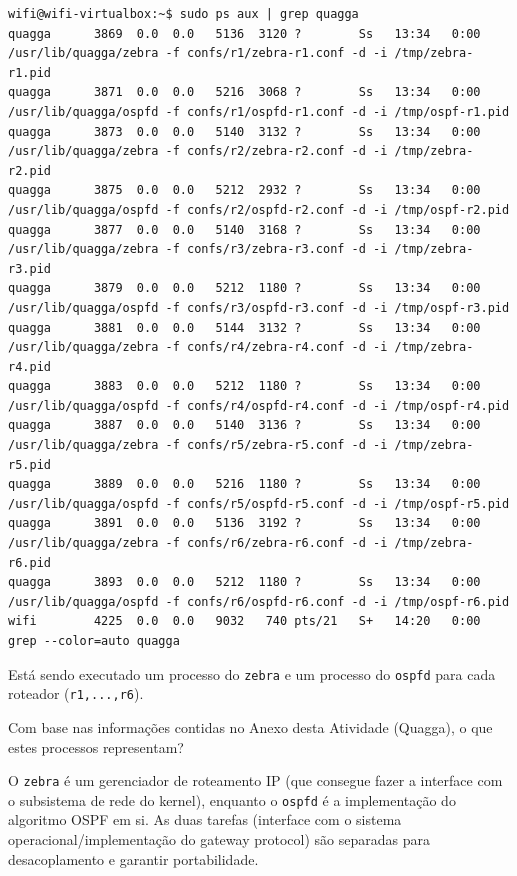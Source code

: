 \documentclass{article}
\begin{document}
\begin{lstlisting}
wifi@wifi-virtualbox:~$ sudo ps aux | grep quagga
quagga      3869  0.0  0.0   5136  3120 ?        Ss   13:34   0:00 /usr/lib/quagga/zebra -f confs/r1/zebra-r1.conf -d -i /tmp/zebra-r1.pid                                                                                           
quagga      3871  0.0  0.0   5216  3068 ?        Ss   13:34   0:00 /usr/lib/quagga/ospfd -f confs/r1/ospfd-r1.conf -d -i /tmp/ospf-r1.pid
quagga      3873  0.0  0.0   5140  3132 ?        Ss   13:34   0:00 /usr/lib/quagga/zebra -f confs/r2/zebra-r2.conf -d -i /tmp/zebra-r2.pid
quagga      3875  0.0  0.0   5212  2932 ?        Ss   13:34   0:00 /usr/lib/quagga/ospfd -f confs/r2/ospfd-r2.conf -d -i /tmp/ospf-r2.pid
quagga      3877  0.0  0.0   5140  3168 ?        Ss   13:34   0:00 /usr/lib/quagga/zebra -f confs/r3/zebra-r3.conf -d -i /tmp/zebra-r3.pid
quagga      3879  0.0  0.0   5212  1180 ?        Ss   13:34   0:00 /usr/lib/quagga/ospfd -f confs/r3/ospfd-r3.conf -d -i /tmp/ospf-r3.pid
quagga      3881  0.0  0.0   5144  3132 ?        Ss   13:34   0:00 /usr/lib/quagga/zebra -f confs/r4/zebra-r4.conf -d -i /tmp/zebra-r4.pid
quagga      3883  0.0  0.0   5212  1180 ?        Ss   13:34   0:00 /usr/lib/quagga/ospfd -f confs/r4/ospfd-r4.conf -d -i /tmp/ospf-r4.pid
quagga      3887  0.0  0.0   5140  3136 ?        Ss   13:34   0:00 /usr/lib/quagga/zebra -f confs/r5/zebra-r5.conf -d -i /tmp/zebra-r5.pid
quagga      3889  0.0  0.0   5216  1180 ?        Ss   13:34   0:00 /usr/lib/quagga/ospfd -f confs/r5/ospfd-r5.conf -d -i /tmp/ospf-r5.pid
quagga      3891  0.0  0.0   5136  3192 ?        Ss   13:34   0:00 /usr/lib/quagga/zebra -f confs/r6/zebra-r6.conf -d -i /tmp/zebra-r6.pid
quagga      3893  0.0  0.0   5212  1180 ?        Ss   13:34   0:00 /usr/lib/quagga/ospfd -f confs/r6/ospfd-r6.conf -d -i /tmp/ospf-r6.pid
wifi        4225  0.0  0.0   9032   740 pts/21   S+   14:20   0:00 grep --color=auto quagga
\end{lstlisting}

Está sendo executado um processo do \texttt{zebra} e um processo do \texttt{ospfd} para cada roteador (\texttt{r1,...,r6}).

\begin{tcolorbox}
    Com base nas informações contidas no Anexo desta Atividade (Quagga), o que estes processos representam?
\end{tcolorbox}

O \texttt{zebra} é um gerenciador de roteamento IP (que consegue
fazer a interface com o subsistema de rede do kernel), enquanto
o \texttt{ospfd} é a implementação do algoritmo OSPF em si. As
duas tarefas (interface com o sistema operacional/implementação
do gateway protocol) são separadas para desacoplamento e garantir
portabilidade.
\end{document}
